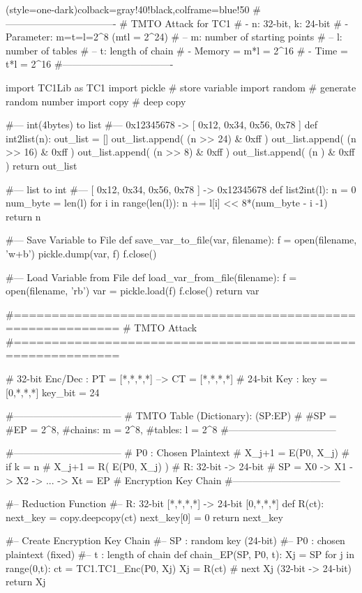 \newpage
\begin{python}(style=one-dark){colback=gray!40!black,colframe=blue!50}
#----------------------------------
# TMTO Attack for TC1
# - n: 32-bit, k: 24-bit
# - Parameter: m=t=l=2^8 (mtl = 2^24)
# -- m: number of starting points
# -- l: number of tables
# -- t: length of chain
# - Memory = m*l = 2^16
# - Time   = t*l = 2^16
#----------------------------------

import TC1Lib as TC1
import pickle # store variable
import random # generate random number
import copy   # deep copy 

#--- int(4bytes) to list 
#--- 0x12345678 -> [ 0x12, 0x34, 0x56, 0x78 ]
def int2list(n):
   out_list = []
   out_list.append( (n >> 24) & 0xff )
   out_list.append( (n >> 16) & 0xff )
   out_list.append( (n >>  8) & 0xff )
   out_list.append( (n      ) & 0xff )
   return out_list

#--- list to int
#--- [ 0x12, 0x34, 0x56, 0x78 ] -> 0x12345678
def list2int(l):
   n = 0
   num_byte = len(l)
   for i in range(len(l)):
      n += l[i] << 8*(num_byte - i -1)
   return n

#--- Save Variable to File
def save_var_to_file(var, filename):
   f = open(filename, 'w+b')
   pickle.dump(var, f)
   f.close()

#--- Load Variable from File
def load_var_from_file(filename):
   f = open(filename, 'rb')
   var = pickle.load(f)
   f.close()
   return var

#============================================================
#  TMTO Attack
#============================================================

# 32-bit Enc/Dec : PT = [*,*,*,*] --> CT = [*,*,*,*]
# 24-bit Key     : key = [0,*,*,*]
key_bit = 24

#---------------------------------
# TMTO Table (Dictionary): { (SP:EP) }
#   #SP = #EP = 2^8,   #chains: m = 2^8, #tables: l = 2^8
#---------------------------------

#---------------------------------
# P0 : Chosen Plaintext
# X_{j+1} = E(P0, X_{j}) 		# if k = n
# X_{j+1} = R( E(P0, X_{j}) ) 	   # R: 32-bit -> 24-bit
# SP = X0 -> X1 -> X2 -> ... -> Xt = EP  # Encryption Key Chain
#---------------------------------

#-- Reduction Function
#-- R: 32-bit [*,*,*,*] -> 24-bit [0,*,*,*]
def R(ct):
   next_key = copy.deepcopy(ct)
   next_key[0] = 0
   return next_key

#-- Create Encryption Key Chain
#-- SP : random key (24-bit)
#-- P0 : chosen plaintext (fixed)
#-- t  : length of chain
def chain_EP(SP, P0, t):
   Xj = SP
   for j in range(0,t):
      ct = TC1.TC1_Enc(P0, Xj)
      Xj = R(ct)   # next Xj (32-bit -> 24-bit)
   return Xj


\end{python}
